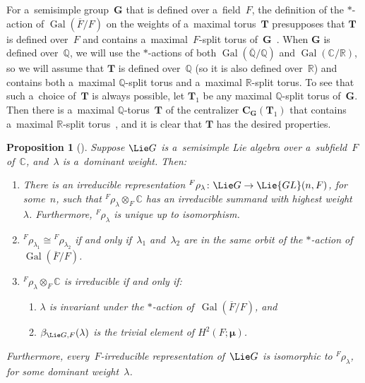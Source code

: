 \documentclass[pdftex]{sigma}
\DeclareMathOperator{\Gal}{Gal}
\numberwithin{equation}{section}
\newtheorem{prop}{Proposition}[section]
\begin{document}
\begin{rem}
For a~semisimple group~$\mathbf{G}$ that is def\/ined over a~f\/ield~$F$, the def\/inition of the $*$-action of
$\Gal(\overline{F}/F)$ on the weights of a~maximal torus~$\mathbf{T}$ presupposes that $\mathbf{T}$ is def\/ined over~$F$
and contains a~maximal~$F$-split torus of~$\mathbf{G}$~\cite[p.~66]{PlatonovRapinchukBook}.
When $\mathbf{G}$ is def\/ined over~$\mathbb{Q}$, we will use the $*$-actions of both $\Gal(\overline{\mathbb{Q}}/\mathbb{Q})$ and $\Gal(\mathbb{C}/\mathbb{R})$, so we will assume that $\mathbf{T}$ is def\/ined
over~$\mathbb{Q}$ (so it is also def\/ined over~$\mathbb{R}$) and contains both a~maximal $\mathbb{Q}$-split torus and
a~maximal $\mathbb{R}$-split torus.
To see that such a~choice of~$\mathbf{T}$ is always possible, let $\mathbf{T}_1$ be any maximal $\mathbb{Q}$-split torus
of~$\mathbf{G}$.
Then there is a~maximal $\mathbb{Q}$-torus~$\mathbf{T}$ of the centralizer $\mathbf{C}_{\mathbf{G}}(\mathbf{T}_1)$ that
contains a~maximal $\mathbb{R}$-split torus~\cite[Corollary~2 of Proposition~7.8, p.~418]{PlatonovRapinchukBook}, and it is clear
that $\mathbf{T}$ has the desired properties.
\end{rem}

\begin{prop}[]\label{HighWt}
Suppose $\Lie G$ is a~semisimple Lie algebra over a~subfield~$F$ of~$\mathbb{C}$, and~$\lambda$ is a~dominant weight.
Then:
\renewcommand{\labelenumi}{{\rm \theenumi.}}
\begin{enumerate}\itemsep=0pt
\item There is an irreducible representation ${}^F \rho_\lambda \colon \Lie G \to \Lie{GL}(n, F)$, for some~$n$, such
that \mbox{${}^F \rho_\lambda \otimes_F \mathbb{C}$} has an irreducible summand with highest weight~$\lambda$.
Furthermore, ${}^F \rho_\lambda$ is unique up to isomorphism.

\item ${}^F \rho_{\lambda_1} \cong {}^F \rho_{\lambda_2}$ if and only if~$\lambda_1$ and~$\lambda_2$ are in the same
orbit of the $*$-action of~$\Gal(\overline{F}/F)$.

\item
\label{HighWt-IrredIff}
${}^F \rho_\lambda \otimes_F \mathbb{C}$ is irreducible if and only if:
\begin{enumerate}[{\rm (a)}]\itemsep=0pt
\item
$\lambda$ is invariant under the $*$-action of~$\Gal(\overline{F}/F)$, and
\item
$\beta_{\Lie G,F}(\lambda)$ is the trivial element of $H^2(F; \boldsymbol\mu)$.
\end{enumerate}
\end{enumerate}
Furthermore, every~$F$-irreducible representation of~$\Lie G$ is isomorphic to ${}^F \rho_{\lambda}$, for some
dominant weight~$\lambda$.
\end{prop}
\end{document}
